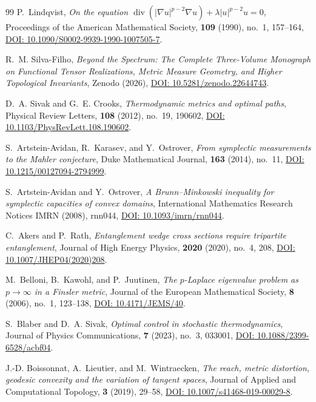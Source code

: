 \documentclass[11pt,a4paper,reqno]{amsart}
\theoremstyle{definition}
\theoremstyle{remark}
\numberwithin{equation}{section}
\begin{document}
\begin{thebibliography}{99}
P.~Lindqvist,
\emph{On the equation $\operatorname{div}(|\nabla u|^{p-2}\nabla u) + \lambda|u|^{p-2}u = 0$},
Proceedings of the American Mathematical Society, \textbf{109} (1990), no.~1, 157--164,
\href{https://doi.org/10.1090/S0002-9939-1990-1007505-7}{DOI: 10.1090/S0002-9939-1990-1007505-7}.

R.~M. Silva-Filho,
\emph{Beyond the Spectrum: The Complete Three-Volume Monograph on Functional Tensor Realizations, Metric Measure Geometry, and Higher Topological Invariants},
Zenodo (2026),
\href{https://doi.org/10.5281/zenodo.22644743}{DOI: 10.5281/zenodo.22644743}.

D.~A. Sivak and G.~E. Crooks,
\emph{Thermodynamic metrics and optimal paths},
Physical Review Letters, \textbf{108} (2012), no.~19, 190602,
\href{https://doi.org/10.1103/PhysRevLett.108.190602}{DOI: 10.1103/PhysRevLett.108.190602}.

S.~Artstein-Avidan, R.~Karasev, and Y.~Ostrover,
\emph{From symplectic measurements to the Mahler conjecture},
Duke Mathematical Journal, \textbf{163} (2014), no.~11,
\href{https://doi.org/10.1215/00127094-2794999}{DOI: 10.1215/00127094-2794999}.

S.~Artstein-Avidan and Y.~Ostrover,
\emph{A Brunn--Minkowski inequality for symplectic capacities of convex domains},
International Mathematics Research Notices IMRN (2008), rnn044,
\href{https://doi.org/10.1093/imrn/rnn044}{DOI: 10.1093/imrn/rnn044}.

C.~Akers and P.~Rath,
\emph{Entanglement wedge cross sections require tripartite entanglement},
Journal of High Energy Physics, \textbf{2020} (2020), no.~4, 208,
\href{https://doi.org/10.1007/JHEP04(2020)208}{DOI: 10.1007/JHEP04(2020)208}.

M.~Belloni, B.~Kawohl, and P.~Juutinen,
\emph{The $p$-Laplace eigenvalue problem as $p\to\infty$ in a Finsler metric},
Journal of the European Mathematical Society, \textbf{8} (2006), no.~1, 123--138,
\href{https://doi.org/10.4171/JEMS/40}{DOI: 10.4171/JEMS/40}.

S.~Blaber and D.~A. Sivak,
\emph{Optimal control in stochastic thermodynamics},
Journal of Physics Communications, \textbf{7} (2023), no.~3, 033001,
\href{https://doi.org/10.1088/2399-6528/acbf04}{DOI: 10.1088/2399-6528/acbf04}.

J.-D. Boissonnat, A.~Lieutier, and M.~Wintraecken,
\emph{The reach, metric distortion, geodesic convexity and the variation of tangent spaces},
Journal of Applied and Computational Topology, \textbf{3} (2019), 29--58,
\href{https://doi.org/10.1007/s41468-019-00029-8}{DOI: 10.1007/s41468-019-00029-8}.


\end{thebibliography}
\end{document}
